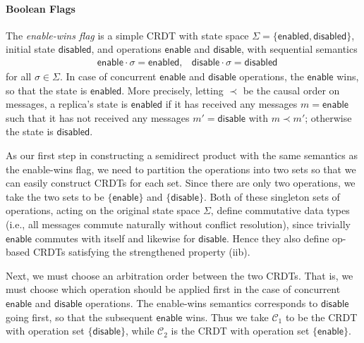 \documentclass[acmsmall,nonacm]{acmart}
\newcommand{\mc}[1]{\ensuremath{\mathcal{#1}}}
\newcommand{\msf}[1]{\ensuremath{\mathsf{#1}}}
\theoremstyle{plain}
\theoremstyle{definition}
\begin{document}
\paragraph{Boolean Flags}
The \textit{enable-wins flag} \cite{riak_datatypes} is a simple CRDT with state space $\Sigma = \{\msf{enabled}, \msf{disabled}\}$, initial state $\msf{disabled}$, and operations $\msf{enable}$ and $\msf{disable}$, with sequential semantics
\begin{align*}
&\msf{enable} \cdot \sigma = \msf{enabled}, &\msf{disable} \cdot \sigma = \msf{disabled}
\end{align*}
for all $\sigma \in \Sigma$.  In case of concurrent $\msf{enable}$ and $\msf{disable}$ operations, the $\msf{enable}$ wins, so that the state is $\msf{enabled}$.  More precisely, letting $\prec$ be the causal order on messages, a replica's state is $\msf{enabled}$ if it has received any messages $m = \msf{enable}$ such that it has not received any messages $m' = \msf{disable}$ with $m \prec m'$; otherwise the state is $\msf{disabled}$.

As our first step in constructing a semidirect product with the same semantics as the enable-wins flag, we need to partition the operations into two sets so that we can easily construct CRDTs for each set.  Since there are only two operations, we take the two sets to be $\{\msf{enable}\}$ and $\{\msf{disable}\}$.  Both of these singleton sets of operations, acting on the original state space $\Sigma$, define commutative data types (i.e., all messages commute naturally without conflict resolution), since trivially $\msf{enable}$ commutes with itself and likewise for $\msf{disable}$.  Hence they also define op-based CRDTs satisfying the strengthened property (iib).

Next, we must choose an arbitration order between the two CRDTs.  That is, we must choose which operation should be applied first in the case of concurrent $\msf{enable}$ and $\msf{disable}$ operations.  The enable-wins semantics corresponds to $\msf{disable}$ going first, so that the subsequent $\msf{enable}$ wins.  Thus we take $\mc{C}_1$ to be the CRDT with operation set $\{\msf{disable}\}$, while $\mc{C}_2$ is the CRDT with operation set $\{\msf{enable}\}$.
\end{document}
